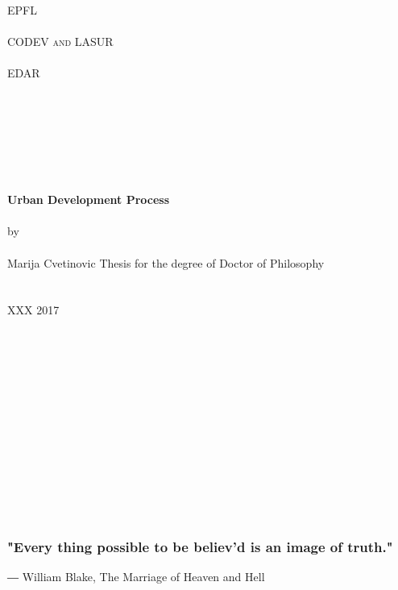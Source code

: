 \documentclass[11pt]{report}
\begin{document}
\begin{titlepage}
\begin{center}
\large
\textsc{EPFL} \\
\ \\
\textsc{CODEV and LASUR} \\
\ \\
\textsc{EDAR}\\
\ \\
\ \\
\ \\
\ \\
\ \\
\ \\
\ \\
\Huge
\textbf{Urban Development Process}
\ \\
\ \\
\large by
\ \\
\ \\
Marija Cvetinovic
\vfill
Thesis for the degree of Doctor of Philosophy \\
\ \\
\ \\
XXX 2017
\end{center}
\end{titlepage}
\begin{titlepage}
\begin{center}
\ \\
\ \\
\ \\
\ \\
\ \\
\ \\
\ \\
\ \\
\ \\
\ \\
\ \\
\ \\
\subsubsection{"Every thing possible to be believ'd is an image of truth."}

\end{center}

\begin{flushright}
― William Blake, The Marriage of Heaven and Hell
\end{flushright}

\end{titlepage}

\end{document}
